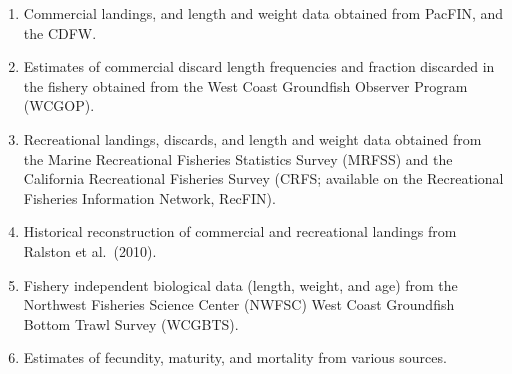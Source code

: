 \documentclass[11pt,
  english,
  a4paper,
]{article}
\begin{document}
\begin{enumerate}
\def\labelenumi{\arabic{enumi}.}
\item

  Commercial landings, and length and weight data obtained from PacFIN, and the CDFW.

  \tagmcend\tagstructend\tagstructend
\item

  Estimates of commercial discard length frequencies and fraction discarded in the fishery obtained from the West Coast Groundfish Observer Program (WCGOP).

  \tagmcend\tagstructend\tagstructend
\item

  Recreational landings, discards, and length and weight data obtained from the Marine Recreational Fisheries Statistics Survey (MRFSS) and the California Recreational Fisheries Survey (CRFS; available on the Recreational Fisheries Information Network, RecFIN).

  \tagmcend\tagstructend\tagstructend
\item

  Historical reconstruction of commercial and recreational landings from Ralston et al.~{(2010)\leavevmode\tagmcend\tagstructend}.

  \tagmcend\tagstructend\tagstructend
\item

  Fishery independent biological data (length, weight, and age) from the Northwest Fisheries Science Center (NWFSC) West Coast Groundfish Bottom Trawl Survey (WCGBTS).

  \tagmcend\tagstructend\tagstructend
\item

  Estimates of fecundity, maturity, and mortality from various sources.

  \tagmcend\tagstructend\tagstructend
\end{enumerate}

\tagstructend

\end{document}
